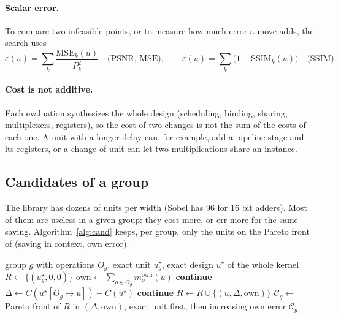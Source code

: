 \documentclass[11pt,a4paper]{article}
\newcommand{\Cost}{C}
\begin{document}
\paragraph{Scalar error.} To compare two infeasible points, or to measure how much error a move adds, the search uses
\[
  \varepsilon(u) = \sum_k \frac{\text{MSE}_k(u)}{P_k^2} \quad\text{(PSNR, MSE)}, \qquad
  \varepsilon(u) = \sum_k \big(1 - \text{SSIM}_k(u)\big) \quad\text{(SSIM)}.
\]

\paragraph{Cost is not additive.} Each evaluation synthesizes the whole design (scheduling, binding, sharing,
multiplexers, registers), so the cost of two changes is not the sum of the costs of each one. A unit with a longer
delay can, for example, add a pipeline stage and its registers, or a change of unit can let two multiplications share
an instance.

\subsection{Candidates of a group}

The library has dozens of units per width (Sobel has 96 for 16 bit adders). Most of them are useless in a given
group: they cost more, or err more for the same saving. Algorithm~\ref{alg:cand} keeps, per group, only the units on
the Pareto front of (saving in context, own error).

\begin{algorithm}[H]
\caption{Candidates of a group}\label{alg:cand}
\begin{algorithmic}[1]
\Require group $g$ with operations $O_g$, exact unit $u^\star_g$, exact design $u^\star$ of the whole kernel
\State $R \gets \{ (u^\star_g, 0, 0) \}$
  \State $\text{own} \gets \sum_{o \in O_g} m_o^{\text{own}}(u)$
   \textbf{continue} 
  \EndIf
  \State $\Delta \gets \Cost(u^\star[O_g \mapsto u]) - \Cost(u^\star)$ 
   \textbf{continue}
  \EndIf
  \State $R \gets R \cup \{(u, \Delta, \text{own})\}$
\EndFor
\State $\mathcal{C}_g \gets$ Pareto front of $R$ in $(\Delta, \text{own})$, exact unit first, then increasing own error
\State \Return $\mathcal{C}_g$
\end{algorithmic}
\end{algorithm}
\end{document}

